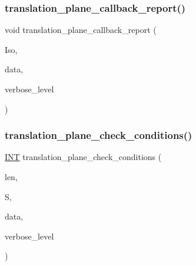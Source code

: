 \mbox{\label{translation__plane2_8_c_aeff5feb3c1b948f39c229c9bd6afd267}} 
\subsubsection{\texorpdfstring{translation\+\_\+plane\+\_\+callback\+\_\+report()}{translation\_plane\_callback\_report()}}
{\footnotesize\ttfamily void translation\+\_\+plane\+\_\+callback\+\_\+report (\begin{DoxyParamCaption}\item[{\mbox{\hyperlink{classisomorph}{isomorph}} $\ast$}]{Iso,  }\item[{void $\ast$}]{data,  }\item[{\mbox{\hyperlink{galois_8h_a09fddde158a3a20bd2dcadb609de11dc}{I\+NT}}}]{verbose\+\_\+level }\end{DoxyParamCaption})}

\mbox{\label{translation__plane2_8_c_aed777cfdf2ecbf77f3fd004c391bc65f}} 
\subsubsection{\texorpdfstring{translation\+\_\+plane\+\_\+check\+\_\+conditions()}{translation\_plane\_check\_conditions()}}
{\footnotesize\ttfamily \mbox{\hyperlink{galois_8h_a09fddde158a3a20bd2dcadb609de11dc}{I\+NT}} translation\+\_\+plane\+\_\+check\+\_\+conditions (\begin{DoxyParamCaption}\item[{\mbox{\hyperlink{galois_8h_a09fddde158a3a20bd2dcadb609de11dc}{I\+NT}}}]{len,  }\item[{\mbox{\hyperlink{galois_8h_a09fddde158a3a20bd2dcadb609de11dc}{I\+NT}} $\ast$}]{S,  }\item[{void $\ast$}]{data,  }\item[{\mbox{\hyperlink{galois_8h_a09fddde158a3a20bd2dcadb609de11dc}{I\+NT}}}]{verbose\+\_\+level }\end{DoxyParamCaption})}


